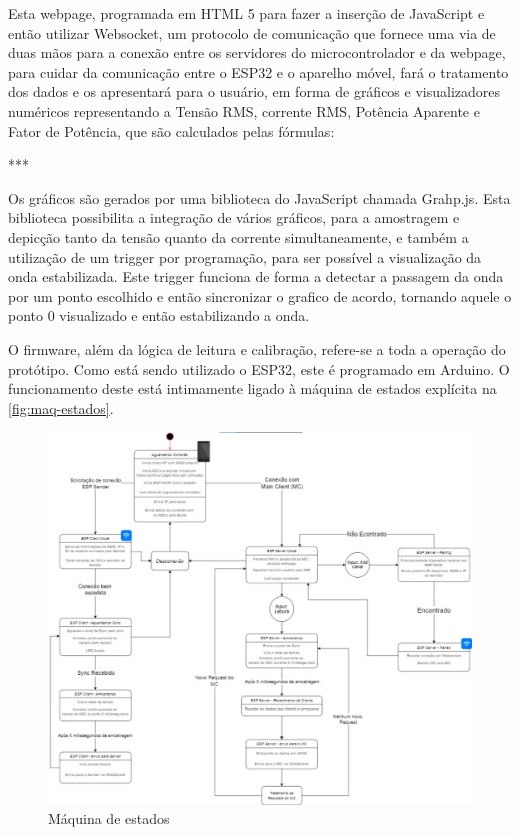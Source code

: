 Esta webpage, programada em HTML 5 para fazer a inserção de JavaScript e então utilizar Websocket, um protocolo de comunicação que fornece uma via de duas mãos para a conexão entre os servidores do microcontrolador e da webpage, para cuidar da comunicação entre o ESP32 e o aparelho móvel, fará o tratamento dos dados e os apresentará para o usuário, em forma de gráficos e visualizadores numéricos representando a Tensão RMS, corrente RMS, Potência Aparente e Fator de Potência, que são calculados pelas fórmulas:


***

Os gráficos são gerados por uma biblioteca do JavaScript chamada Grahp.js. Esta biblioteca possibilita a integração de vários gráficos, para a amostragem e depicção tanto da tensão quanto da corrente simultaneamente, e também a utilização de um trigger por programação, para ser possível a visualização da onda estabilizada. Este trigger funciona de forma a detectar a passagem da onda por um ponto escolhido e então sincronizar o grafico de acordo, tornando aquele o ponto 0 visualizado e então estabilizando a onda.



O firmware, além da lógica de leitura e calibração, refere-se a toda a operação do protótipo. Como está sendo utilizado o ESP32, este é programado em Arduino. O funcionamento deste está intimamente ligado à máquina de estados explícita na \autoref{fig:maq-estados}.

\begin{figure}[htb!]
    \caption{Máquina de estados}
    \label{fig:maq-estados}
    \includegraphics[width=1.0\textwidth]{figuras/maq-estados.png}
    \fonte{}
\end{figure}

